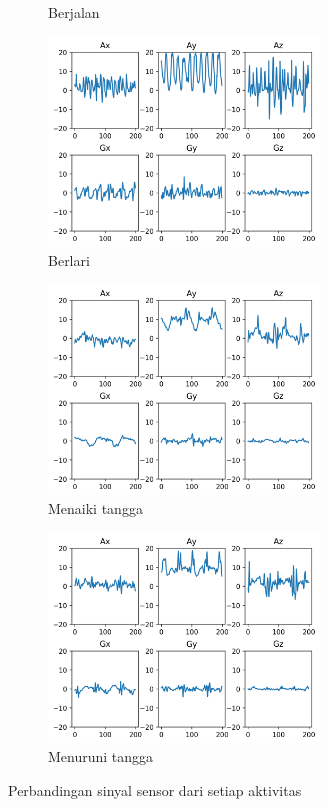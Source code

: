 \begin{figure}[h!]
\begin{subfigure}{0.5\textwidth}
        \caption{Berjalan}
        \label{gambar:plot-sensor-berjalan}
    \end{subfigure}
    \begin{subfigure}{0.5\textwidth}
        \includegraphics[width=7.2cm]{data/plot-sensor/berlari.png}
        \caption{Berlari}
        \label{gambar:plot-sensor-berlari}
    \end{subfigure}
    \begin{subfigure}{0.5\textwidth}
        \includegraphics[width=7.2cm]{data/plot-sensor/naik-tangga.png}
        \caption{Menaiki tangga}
        \label{gambar:plot-sensor-naik-tangga}
    \end{subfigure}
    \begin{subfigure}{0.5\textwidth}
        \includegraphics[width=7.2cm]{data/plot-sensor/turun-tangga.png}
        \caption{Menuruni tangga}
        \label{gambar:plot-sensor-turun-tangga}
    \end{subfigure}

    \caption{Perbandingan sinyal sensor dari setiap aktivitas}
    \label{gambar:plot-sensor}
\end{figure}

